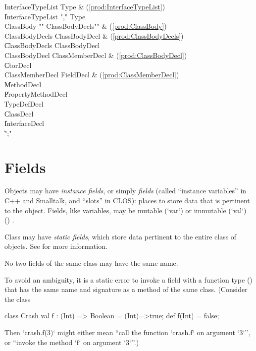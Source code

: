 \begin{bbgrammar}
 InterfaceTypeList    \: Type & (\ref{prod:InterfaceTypeList})\\%
    \| InterfaceTypeList \xcd"," Type\\
 ClassBody    \: \xcd"{" ClassBodyDecls\opt \xcd"}" & (\ref{prod:ClassBody})\\%
 ClassBodyDecls    \: ClassBodyDecl & (\ref{prod:ClassBodyDecls})\\%
    \| ClassBodyDecls ClassBodyDecl\\
 ClassBodyDecl    \: ClassMemberDecl & (\ref{prod:ClassBodyDecl})\\%
    \| CtorDecl\\
 ClassMemberDecl    \: FieldDecl & (\ref{prod:ClassMemberDecl})\\%
    \| MethodDecl\\
    \| PropertyMethodDecl\\
    \| TypeDefDecl\\
    \| ClassDecl\\
    \| InterfaceDecl\\
    \| \xcd";"\\

\end{bbgrammar}





\section{Fields}
\label{FieldDefinitions}

Objects may have {\em instance fields}, or simply {\em fields} (called
``instance variables'' in C++ and Smalltalk, and ``slots'' in CLOS): places to
store data that is pertinent to the object. Fields, like variables, may be
mutable (\xcd`var`) or immutable (\xcd`val`) %
() .

Class may have {\em static fields}, which store data pertinent to the
entire class of objects.  
See  for more information.

No two fields of the same class may have the same name.

To avoid an ambiguity, it is a static error to invoke  a field with a function
type () that has 
the same name and signature  as a method of the same class.  
(Consider the class 
\begin{xten}
class Crash {
  val f : (Int) => Boolean = (Int)=>true;
  def f(Int) = false;
}
\end{xten}
\noindent
Then \xcd`crash.f(3)` might either mean ``call the function \xcd`crash.f` on
argument \xcd`3`'', or ``invoke the method \xcd`f` on argument \xcd`3`''.)

